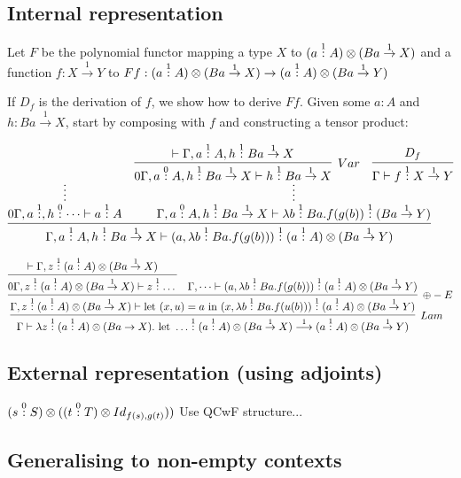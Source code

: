 \documentclass[12pt,a4paper]{article}
\begin{document}
\subsection{Internal representation}
Let $F$ be the polynomial functor mapping a type $X$ to $(a \overset{1}{:} A) \otimes (Ba \overset{1}\to X)$ and a function $f : X \overset{1}\to Y$ to $Ff : (a \overset{1}{:} A)\otimes(Ba \overset{1}{\to} X) \to (a \overset{1}{:} A)\otimes(Ba \overset{1}{\to } Y)$

If $D_f$ is the derivation of $f$, we show how to derive $Ff$. Given some $a : A$ and $h : B a \overset{1}\to X$, start by composing with $f$ and constructing a tensor product:

$$ 
\infer{\Gamma, a \of{1} A, h \of{1} B a \overset{1}\to X \vdash (a, \lambda b \of{1} B a. f(g(b))) \of{1} (a \of{1} A)\otimes(B a \overset{1}\to Y)}{
  \infer*{0\Gamma, a \of{1}, h \of{0} \dots \vdash a \of{1} A}{}
  & 
\infer*{\Gamma, a \of{0} A, h \of{1} B a \overset{1}\to X \vdash \lambda b \of{1} B a. f(g(b)) \of{1} (B a \overset{1}\to Y) }{
  \infer[Var]{0\Gamma, a \of{0} A, h \of{1} B a \overset{1}\to X \vdash h \of{1} B a \overset{1} \to X}{
      \vdash \Gamma, a \of{1} A, h \of{1} B a \overset{1}\to X
    }
  & 
  \infer{\Gamma \vdash f \of{1} X \overset{1}\to Y}{
    D_f
  }
}
}
$$


$$\infer[Lam]{\Gamma \vdash \lambda z \of {1} (a \of{1} A) \otimes (B a \to X). \text{ let } \dots \of{1} (a \of{1} A) \otimes (B a \overset{1} \to X) \overset{1}\longrightarrow (a \of{1} A) \otimes (B a \overset{1} \to Y)} {
  \infer[\oplus-E]{\Gamma,  z \of{1}  (a \of{1} A) \otimes(B a \overset{1}\to X) \vdash \text{let } (x,u) = a \text{ in } (x , \lambda b \of{1} Ba. f(u(b))) \of{1} (a \of{1} A)\otimes(B a \overset{1}\to Y)   }{
    \infer{0\Gamma, z \of{1} (a \of{1} A) \otimes (B a \overset{1}\to X) \vdash  z \of{1} \dots} {
      \vdash \Gamma, z \of{1} (a \of{1} A) \otimes (B a \overset{1}\to X)
    }
    &
    \Gamma, \dots \vdash (a, \lambda b \of{1} B a. f(g(b))) \of{1} (a \of{1} A)\otimes(B a \overset{1}\to Y)
  }
}
$$

\subsection{External representation (using adjoints)}
$(s \overset{0}{:} S) \otimes ((t \overset{0}{:} T) \otimes Id_{f(s) ,g(t) })) $
Use QCwF structure... 
\subsection{Generalising to non-empty contexts}
\end{document}
